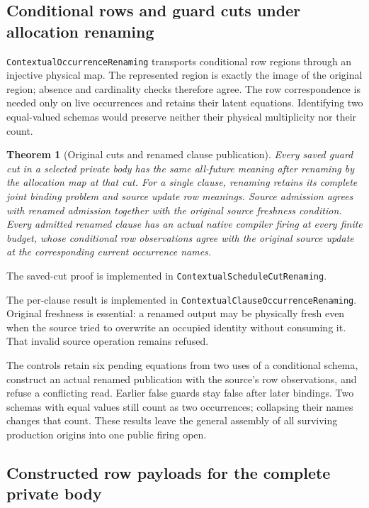 \documentclass[11pt]{article}
\newtheorem{theorem}{Theorem}
\newcommand{\code}[1]{\texttt{\small #1}}
\begin{document}
\subsection{Conditional rows and guard cuts under allocation renaming}

\code{ContextualOccurrenceRenaming} transports conditional row regions
through an injective physical map. The represented region is exactly the
image of the original region; absence and cardinality checks therefore
agree. The row correspondence is needed only on live occurrences and
retains their latent equations. Identifying two equal-valued schemas
would preserve neither their physical multiplicity nor their count.

\begin{theorem}[Original cuts and renamed clause publication]
Every saved guard cut in a selected private body has the same all-future
meaning after renaming by the allocation map at that cut. For a single
clause, renaming retains its complete joint binding problem and source
update row meanings. Source admission agrees with renamed admission
together with the original source freshness condition. Every admitted
renamed clause has an actual native compiler firing at every finite
budget, whose conditional row observations agree with the original
source update at the corresponding current occurrence names.
\end{theorem}
The saved-cut proof is implemented in
\code{ContextualScheduleCutRenaming}.

The per-clause result is implemented in
\code{ContextualClauseOccurrenceRenaming}. Original freshness is
essential: a renamed output may be physically fresh even when the
source tried to overwrite an occupied identity without consuming it.
That invalid source operation remains refused.

The controls retain six pending equations from two uses of a conditional
schema, construct an actual renamed publication with the source's row
observations, and refuse a conflicting read. Earlier false guards stay
false after later bindings. Two schemas with equal values still count
as two occurrences; collapsing their names changes that count. These
results leave the general assembly of all surviving production origins
into one public firing open.

\subsection{Constructed row payloads for the complete private body}
\end{document}
